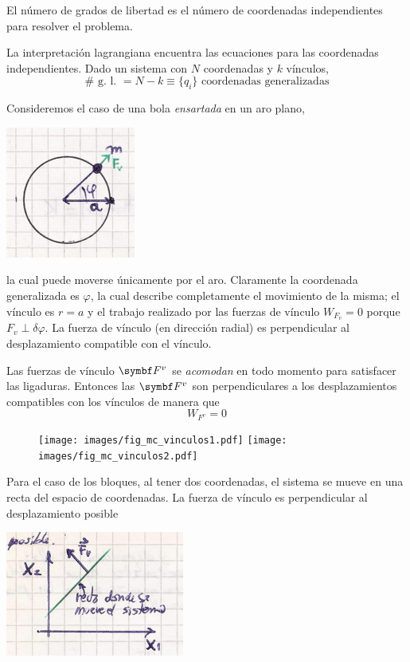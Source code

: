 \documentclass[10pt,oneside]{CBFT_book}
\begin{document}
El número de grados de libertad es el número de coordenadas independientes para resolver el problema.

La interpretación lagrangiana encuentra las ecuaciones para las coordenadas independientes.
Dado un sistema con $N$ coordenadas y $k$ vínculos,
\[
	\# \text{ g. l. } = N - k \equiv \{ q_i \} \text{ coordenadas generalizadas}
\]

Consideremos el caso de una bola {\it ensartada} en un aro plano,

\includegraphics[scale=0.35]{images/fig_mc_bola_ensartada.jpg}

la cual puede moverse únicamente por el aro. Claramente la coordenada generalizada es $\varphi$, la cual
describe completamente el movimiento de la misma; el vínculo es $ r = a $ y el trabajo realizado por las
fuerzas de vínculo $W_{F_v} = 0 $ porque $F_v \perp \delta \varphi$. La fuerza de vínculo (en dirección radial)
es perpendicular al desplazamiento compatible con el vínculo.

Las fuerzas de vínculo $\vb{F}^v$ se {\it acomodan} en todo momento para satisfacer las ligaduras.
Entonces las $\vb{F}^v$ son perpendiculares a los desplazamientos compatibles con los vínculos de
manera que 
\[
	W_{F^v} = 0
\]

\begin{figure}[hbt]
	\begin{center}
	\texttt{[image: images/fig\_mc\_vinculos1.pdf]}	 
	\texttt{[image: images/fig\_mc\_vinculos2.pdf]}
	\end{center}
	\caption{}
\end{figure} 

Para el caso de los bloques, al tener dos coordenadas, el sistema se mueve en una recta del espacio de coordenadas.
La fuerza de vínculo es perpendicular al desplazamiento posible

\includegraphics[scale=0.35]{images/fig_mc_problema_bloques_fases.jpg}
\end{document}
